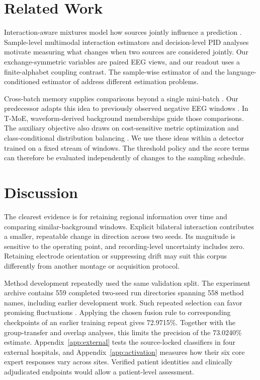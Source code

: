 \documentclass{article}
\newcommand{\tm}{T-MoE}
\begin{document}
\section{Related Work}
Interaction-aware mixtures model how sources jointly influence a prediction \citep{xin2025}. Sample-level multimodal interaction estimators \citep{yang2025} and decision-level PID analyses \citep{fang2026} motivate measuring what changes when two sources are considered jointly. Our exchange-symmetric variables are paired EEG views, and our readout uses a finite-alphabet coupling contrast. The sample-wise estimator of \citet{yang2025} and the language-conditioned estimator of \citet{fang2026} address different estimation problems.

Cross-batch memory supplies comparisons beyond a single mini-batch \citep{wang2020}. Our predecessor adapts this idea to previously observed negative EEG windows \citep{predecessor}. In \tm{}, waveform-derived background memberships guide those comparisons. The auxiliary objective also draws on cost-sensitive metric optimization \citep{mao2025} and class-conditional distribution balancing \citep{zhao2026}. We use these ideas within a detector trained on a fixed stream of windows. The threshold policy and the score terms can therefore be evaluated independently of changes to the sampling schedule.

\section{Discussion}
The clearest evidence is for retaining regional information over time and comparing similar-background windows. Explicit bilateral interaction contributes a smaller, repeatable change in direction across two seeds. Its magnitude is sensitive to the operating point, and recording-level uncertainty includes zero. Retaining electrode orientation or suppressing drift may suit this corpus differently from another montage or acquisition protocol.

Method development repeatedly used the same validation split. The experiment archive contains 559 completed two-seed run directories spanning 558 method names, including earlier development work. Such repeated selection can favor promising fluctuations \citep{cawley2010}. Applying the chosen fusion rule to corresponding checkpoints of an earlier training repeat gives 72.9715\%. Together with the group-transfer and overlap analyses, this limits the precision of the 73.0240\% estimate. Appendix~\ref{app:external} tests the source-locked classifiers in four external hospitals, and Appendix~\ref{app:activation} measures how their six core expert responses vary across sites. Verified patient identities and clinically adjudicated endpoints would allow a patient-level assessment.
\end{document}
